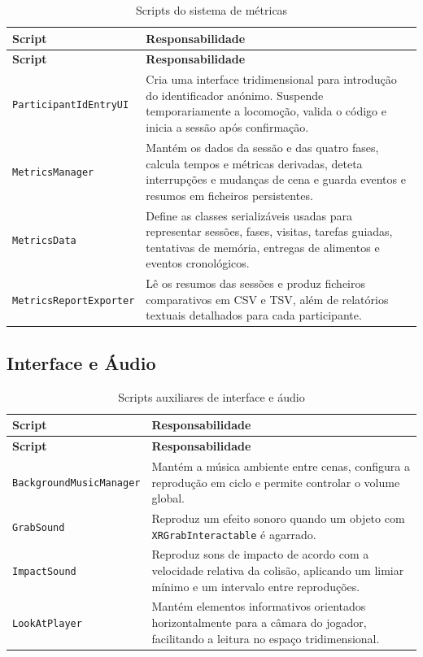 \documentclass[12pt,a4paper,oneside]{report}
\begin{document}
\begin{longtable}{p{4.2cm}p{8.5cm}}
\caption{Scripts do sistema de métricas}
\label{tab:scripts-metricas}\\
\toprule
\textbf{Script} & \textbf{Responsabilidade} \\
\midrule
\endfirsthead
\toprule
\textbf{Script} & \textbf{Responsabilidade} \\
\midrule
\endhead
\texttt{ParticipantIdEntryUI} &
Cria uma interface tridimensional para introdução do identificador anónimo. Suspende temporariamente a locomoção, valida o código e inicia a sessão após confirmação. \\

\texttt{MetricsManager} &
Mantém os dados da sessão e das quatro fases, calcula tempos e métricas derivadas, deteta interrupções e mudanças de cena e guarda eventos e resumos em ficheiros persistentes. \\

\texttt{MetricsData} &
Define as classes serializáveis usadas para representar sessões, fases, visitas, tarefas guiadas, tentativas de memória, entregas de alimentos e eventos cronológicos. \\

\texttt{MetricsReportExporter} &
Lê os resumos das sessões e produz ficheiros comparativos em CSV e TSV, além de relatórios textuais detalhados para cada participante. \\
\bottomrule
\end{longtable}

\subsection{Interface e Áudio}

\begin{longtable}{p{4.2cm}p{8.5cm}}
\caption{Scripts auxiliares de interface e áudio}
\label{tab:scripts-auxiliares}\\
\toprule
\textbf{Script} & \textbf{Responsabilidade} \\
\midrule
\endfirsthead
\toprule
\textbf{Script} & \textbf{Responsabilidade} \\
\midrule
\endhead
\texttt{BackgroundMusicManager} &
Mantém a música ambiente entre cenas, configura a reprodução em ciclo e permite controlar o volume global. \\

\texttt{GrabSound} &
Reproduz um efeito sonoro quando um objeto com \texttt{XRGrabInteractable} é agarrado. \\

\texttt{ImpactSound} &
Reproduz sons de impacto de acordo com a velocidade relativa da colisão, aplicando um limiar mínimo e um intervalo entre reproduções. \\

\texttt{LookAtPlayer} &
Mantém elementos informativos orientados horizontalmente para a câmara do jogador, facilitando a leitura no espaço tridimensional. \\
\bottomrule
\end{longtable}
\end{document}
